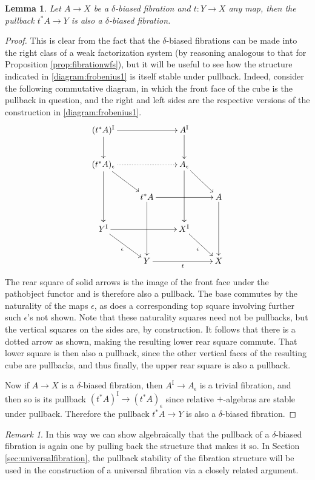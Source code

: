 \documentclass[11pt,reqno]{amsart}
\newcommand{\ra}{\ensuremath{\rightarrow}}
\renewcommand{\to}{\ensuremath{\rightarrow}}
\newcommand{\I}{\ensuremath{\mathrm{I}}}
\newtheorem{lemma}[theorem]{Lemma}
\theoremstyle{remark}
\newtheorem{remark}[theorem]{Remark}
\theoremstyle{definition}
\begin{document}
\begin{lemma}\label{lemma:fibrationspullback}
Let  $A \ra X$ be a $\delta$-biased fibration and $t: Y\ra X$ any map, then the pullback $t^*A \ra Y$ is also a $\delta$-biased  fibration.
\end{lemma}
\begin{proof}
This is clear from the fact that the $\delta$-biased fibrations can be made into the right class of a weak factorization system (by reasoning analogous to that for Proposition \ref{prop:fibrationwfs}), but it will be useful to see how the structure indicated in \eqref{diagram:frobenius1} is itself stable under pullback.  Indeed, consider the following commutative diagram, in which the front face of the cube is the pullback in question, and the right and left sides are the respective versions of the construction in \eqref{diagram:frobenius1}.
%
\begin{equation}\label{diagram:fibrationspullback}
\xymatrix{
 (t^*A)^\I \ar[rr] \ar[d] && A^\I \ar[d] & \\
  (t^*A)_\epsilon \ar[dd] \ar[rd] \ar@{.>}[rr] && A_\epsilon \ar[dd] \ar[rd] & \\
  & t^*A \ar[rr] \ar[dd]  && A \ar[dd]  \\
Y^\I \ar[rd]_\epsilon \ar[rr] & &  X^\I \ar[rd]_\epsilon & \\
 & Y \ar[rr]_t && X 
 }
\end{equation}
%
The rear square of solid arrows is the image of the front face under the pathobject functor and is therefore also a pullback. The base commutes by the naturality of the maps $\epsilon$, as does a corresponding top square involving further such $\epsilon$'s not shown.  Note that these naturality squares need not be pullbacks, but the vertical squares on the sides are, by construction.  It follows that there is a dotted arrow as shown, making the resulting lower rear square commute.  That lower square is then also a pullback, since the other vertical faces of the resulting cube are pullbacks, and thus finally, the upper rear square is also a pullback.  

Now if $A\to X$ is a $\delta$-biased fibration, then $A^\I \to A_\epsilon$ is a trivial fibration, and then so is its pullback $(t^*A)^\I \to (t^*A)_\epsilon$ since relative $+$-algebras are stable under pullback.  Therefore the pullback $t^*A\to Y$ is also a $\delta$-biased fibration.
\end{proof}

\begin{remark}
In this way we can show algebraically that the pullback of a $\delta$-biased fibration is again one by pulling back the structure that makes it so.  In Section \ref{sec:universalfibration}, the pullback stability of the fibration structure will be used in the construction of a universal fibration via a closely related argument.
\end{remark}
\end{document}
